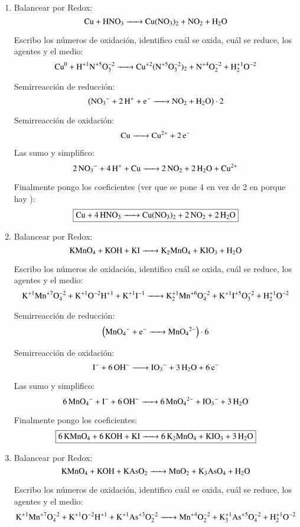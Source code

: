 \begin{enumerate}
\newpage
\item
Balancear por Redox:
$$\ce{
Cu + HNO3 ->
Cu(NO3)2 + NO2 + H2O
}$$

Escribo los números de oxidación, identifico cuál se oxida, cuál se reduce, los agentes y el medio:
$$\ce{
Cu^0 + H^{+1}N^{+5}O^{-2}3 ->
Cu^{+2}(N^{+5}O^{-2}3)2 + N^{+4}O^{-2}2 + H^{+1}2O^{-2}
}$$


\begin{multicols}{2}
Semirreacción de reducción:
$$\left(\ce{
NO3^{-} + 2H^+ + e^- ->
NO2 + H2O
}\right)\cdot 2$$

Semirreacción de oxidación: 
$$\ce{
Cu ->
Cu^{2+} + 2e^-
}$$
\end{multicols}

Las sumo y simplifico:
$$\ce{
2NO3^{-} + 4H^+ + Cu ->
2NO2 + 2 H2O + Cu^{2+}
}$$

Finalmente pongo los coeficientes (ver que se pone 4 en vez de 2 en  porque hay ):
$$\fbox{\ce{
Cu + 4HNO3 ->
Cu(NO3)2 + 2NO2 + 2H2O
}}$$


\item
Balancear por Redox:
$$\ce{
KMnO4 + KOH + KI ->
K2MnO4 + KIO3 + H2O
}$$

Escribo los números de oxidación, identifico cuál se oxida, cuál se reduce, los agentes y el medio:
\[\ce{
K^{+1}Mn^{+7}O^{-2}4 + K^{+1}O^{-2}H^{+1} + K^{+1}I^{-1} ->
K^{+1}2Mn^{+6}O^{-2}4 + K^{+1}I^{+5}O^{-2}3 + H^{+1}2O^{-2}
}\]


\begin{multicols}{2}
Semirreacción de reducción:
$$\left(\ce{
MnO4^- +e^- ->
MnO4^{2-}
}\right)\cdot 6$$

Semirreacción de oxidación:
$$\ce{
I^{-} + 6OH^- ->
IO3^- + 3H2O + 6e^-
}$$
\end{multicols}

Las sumo y simplifico:
$$\ce{
6MnO4^- + I^- + 6OH^- ->
6MnO4^{2-} + IO3^- + 3H2O
}$$

Finalmente pongo los coeficientes:
$$\fbox{\ce{
6KMnO4 + 6KOH + KI ->
6K2MnO4 + KIO3 + 3H2O
}}$$


\newpage 
\item
Balancear por Redox:
$$\ce{
KMnO4 + KOH + KAsO2 ->
MnO2 + K3AsO4 + H2O
}$$

Escribo los números de oxidación, identifico cuál se oxida, cuál se reduce, los agentes y el medio:
\[\ce{
K^{+1}Mn^{+7}O^{-2}4 + K^{+1}O^{-2}H^{+1} + K^{+1}As^{+3}O^{-2}2 ->
Mn^{+4}O^{-2}2 + K^{+1}3As^{+5}O^{-2}4 + H^{+1}2O^{-2}
}\]


\end{enumerate}
